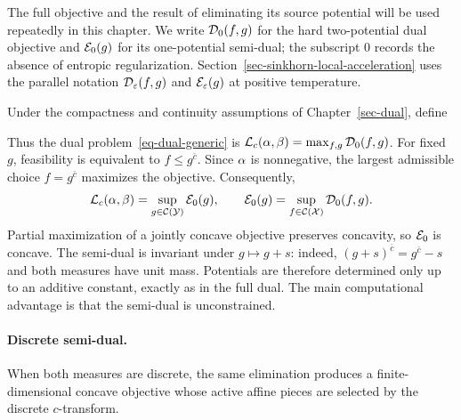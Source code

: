 The full objective and the result of eliminating its source potential will be used repeatedly in this chapter. We write \(\mathcal{D}_0(f,g)\) for the hard two-potential dual objective and \(\mathcal{E}_0(g)\) for its one-potential semi-dual; the subscript \(0\) records the absence of entropic regularization. Section~\ref{sec-sinkhorn-local-acceleration} uses the parallel notation \(\mathcal{D}_\varepsilon(f,g)\) and \(\mathcal{E}_\varepsilon(g)\) at positive temperature.
\begin{defn}\label{def-full-dual-functional}
Under the compactness and continuity assumptions of Chapter~\ref{sec-dual}, define
\end{defn}
Thus the dual problem~\eqref{eq-dual-generic} is $\mathcal{L}_c(\alpha,\beta)=\max_{f,g}\mathcal{D}_0(f,g)$. For fixed $g$, feasibility is equivalent to $f\leq g^{\bar c}$. Since $\alpha$ is nonnegative, the largest admissible choice $f=g^{\bar c}$ maximizes the objective. Consequently,
\[
	\mathcal{L}_c(\alpha,\beta)
	=
	\sup_{g\in\mathcal{C}(\mathcal{Y})}\mathcal{E}_0(g),
	\qquad
	\mathcal{E}_0(g)=\sup_{f\in\mathcal{C}(\mathcal{X})}\mathcal{D}_0(f,g).
\]
Partial maximization of a jointly concave objective preserves concavity, so $\mathcal{E}_0$ is concave. The semi-dual is invariant under $g\mapsto g+s$: indeed, $(g+s)^{\bar c}=g^{\bar c}-s$ and both measures have unit mass. Potentials are therefore determined only up to an additive constant, exactly as in the full dual. The main computational advantage is that the semi-dual is unconstrained.

\paragraph{Discrete semi-dual.}
When both measures are discrete, the same elimination produces a finite-dimensional concave objective whose active affine pieces are selected by the discrete $c$-transform.


